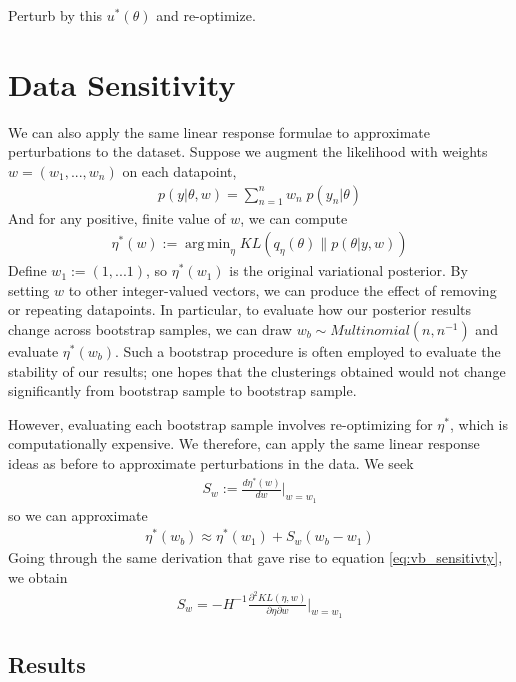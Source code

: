 \documentclass[a4paper]{article}
\DeclareMathOperator*{\argmin}{arg\,min}
\begin{document}
{\color{red} Perturb by this $u^*(\theta)$ and re-optimize. }

\newpage
\section{Data Sensitivity}
\label{sec:data_sens}
We can also apply the same linear response formulae to approximate perturbations to the dataset. Suppose we augment the
likelihood with weights $w = (w_1, ..., w_n)$ on each datapoint,
\begin{align}
  p(y | \theta, w) = \sum_{n=1}^{n} w_n \; p(y_n | \theta)
\end{align}
And for any positive, finite value of $w$, we can compute
\begin{align}
  \eta^*(w) := \argmin_\eta KL(q_\eta(\theta) \| p(\theta| y, w))
\end{align}
Define $w_1 := (1, ... 1)$, so $\eta^*(w_1)$ is the original variational
posterior. By setting $w$ to other integer-valued vectors, we can produce the
effect of removing or repeating datapoints. In particular, to evaluate
how our posterior results change across bootstrap samples, we can
draw
$w_b \sim Multinomial(n, n^{-1})$ and evaluate $\eta^*(w_b)$. Such a bootstrap
procedure is often employed to evaluate the stability of our results; one hopes
that the clusterings obtained would not change significantly
from bootstrap sample to bootstrap sample.

However, evaluating each bootstrap sample involves re-optimizing for
$\eta^*$, which is computationally expensive. We therefore, can apply
the same linear response ideas as before to approximate perturbations in the
data.  We seek
\begin{align}
  S_w := \frac{d\eta^*(w)}{dw}\Big|_{w = w_1}
\end{align}
so we can approximate
\begin{align}
  \eta^*(w_b) \approx \eta^*(w_1) + S_w(w_b - w_1) \label{eq:bs_lin_approx}
\end{align}
Going through the same derivation that gave rise to equation \ref{eq:vb_sensitivty},
we obtain
\begin{align}
  S_w = - H^{-1} \frac{\partial^2 KL(\eta, w)}{\partial \eta\partial w}\Big|_{w = w_1}
\end{align}

\subsection{Results}
\end{document}
